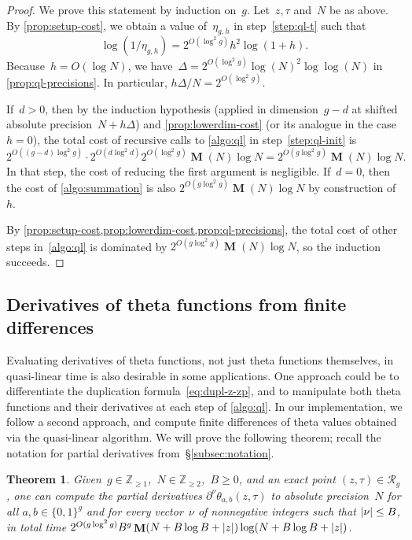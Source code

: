 \documentclass[12pt,oneside]{amsart}
\numberwithin{equation}{section}
\newtheorem{thm}[equation]{Theorem}
\theoremstyle{definition}
\newcommand{\Z}{\mathbb{Z}}
\newcommand{\red}{\mathcal{R}}
\DeclareMathOperator{\Mul}{\mathbf{M}}
\DeclarePairedDelimiter{\abs}{|}{|}
\begin{document}
\begin{proof}
  We prove this statement by induction on~$g$. Let~$z,\tau$ and~$N$ be as
  above. By \cref{prop:setup-cost}, we obtain a value of~$\eta_{g,h}$ in
  step~\eqref{step:ql-t} such that
  \begin{displaymath}
    \log(1/\eta_{g,h}) = 2^{O(\log^2 g)} h^2 \log(1+h).
  \end{displaymath}
  Because~$h = O(\log N)$, we
  have~$\Delta = 2^{O(\log^2 g)} \log(N)^2\log\log(N)$ in
  \cref{prop:ql-precisions}. In particular, $h\Delta/N = 2^{O(\log^2 g)}$.

  If~$d>0$, then by the induction hypothesis (applied in dimension~$g-d$ at
  shifted absolute precision~$N+h\Delta$) and \cref{prop:lowerdim-cost} (or its
  analogue in the case~$h=0$), the total cost of recursive calls to
  \cref{algo:ql} in step~\eqref{step:ql-init} is
  \begin{displaymath}
    2^{O((g-d)\log^2 g)} \cdot 2^{O(d\log^2 d)} 2^{O(\log^2 g)} \Mul(N)\log N = 2^{O(g\log^2 g)} \Mul(N)\log N.
  \end{displaymath}
  In that step, the cost of reducing the first argument is
  negligible. If~$d=0$, then the cost of \cref{algo:summation} is also
  $2^{O(g\log^2 g)} \Mul(N)\log N$ by construction of~$h$.

  By \cref{prop:setup-cost,prop:lowerdim-cost,prop:ql-precisions}, the total
  cost of other steps in~\cref{algo:ql} is dominated by
  $2^{O(g\log^2 g)} \Mul(N)\log N$, so the induction succeeds.
\end{proof}

\subsection{Derivatives of theta functions from finite differences}
\label{subsec:deriv}

Evaluating derivatives of theta functions, not just theta functions themselves,
in quasi-linear time is also desirable in some applications. One approach could
be to differentiate the duplication formula~\eqref{eq:dupl-z-zp}, and to
manipulate both theta functions and their derivatives at each step of
\cref{algo:ql}. In our implementation, we follow a second approach, and compute
finite differences of theta values obtained via the quasi-linear algorithm. We
will prove the following theorem; recall the notation for partial derivatives
from~§\ref{subsec:notation}.

\begin{thm}
  \label{thm:deriv}
  Given~$g\in \Z_{\geq 1}$,~$N\in \Z_{\geq 2}$,~$B\geq 0$, and an
  exact point $(z,\tau)\in \red_g$, one can compute the
  partial derivatives $\partial^\nu\theta_{a,b}(z,\tau)$
  to absolute precision~$N$ for all $a,b\in \{0,1\}^g$ and for every
  vector~$\nu$ of nonnegative integers such that $\abs{\nu}\leq B$, in total
  time $2^{O(g\log^2 g)} B^g \Mul(N + B\log B + \abs{z})\log (N + B\log B + \abs{z})$.
\end{thm}
\end{document}
